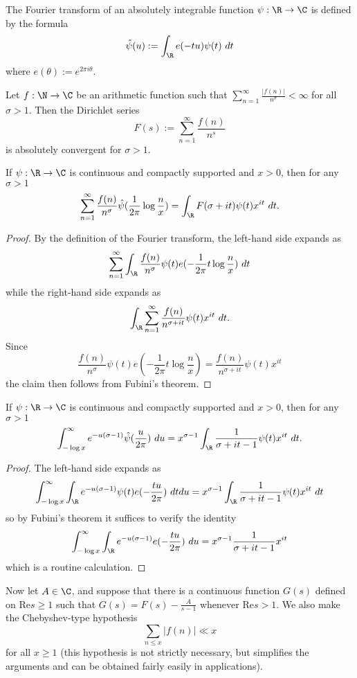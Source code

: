 
The Fourier transform of an absolutely integrable function $\psi: \R \to \C$ is defined by the formula
$$ \hat \psi(u) := \int_\R e(-tu) \psi(t)\ dt$$
where $e(\theta) := e^{2\pi i \theta}$.

Let $f: \N \to \C$ be an arithmetic function such that $\sum_{n=1}^\infty \frac{|f(n)|}{n^\sigma} < \infty$ for all $\sigma>1$.  Then the Dirichlet series
$$ F(s) := \sum_{n=1}^\infty \frac{f(n)}{n^s}$$
is absolutely convergent for $\sigma>1$.

\begin{lemma}\label{first-fourier}  If $\psi: \R \to \C$ is continuous and compactly supported and $x > 0$, then for any $\sigma>1$
  $$ \sum_{n=1}^\infty \frac{f(n)}{n^\sigma} \hat \psi( \frac{1}{2\pi} \log \frac{n}{x} ) = \int_\R F(\sigma + it) \psi(t) x^{it}\ dt.$$
\end{lemma}

\begin{proof}  By the definition of the Fourier transform, the left-hand side expands as
$$ \sum_{n=1}^\infty \int_\R \frac{f(n)}{n^\sigma} \psi(t) e( - \frac{1}{2\pi} t \log \frac{n}{x})\ dt$$
while the right-hand side expands as
$$ \int_\R \sum_{n=1}^\infty \frac{f(n)}{n^{\sigma+it}} \psi(t) x^{it}\ dt.$$
Since
$$\frac{f(n)}{n^\sigma} \psi(t) e( - \frac{1}{2\pi} t \log \frac{n}{x}) = \frac{f(n)}{n^{\sigma+it}} \psi(t) x^{it}$$
the claim then follows from Fubini's theorem.
\end{proof}

\begin{lemma}\label{second-fourier} If $\psi: \R \to \C$ is continuous and compactly supported and $x > 0$, then for any $\sigma>1$
$$ \int_{-\log x}^\infty e^{-u(\sigma-1)} \hat \psi(\frac{u}{2\pi})\ du = x^{\sigma - 1} \int_\R \frac{1}{\sigma+it-1} \psi(t) x^{it}\ dt.$$
\end{lemma}

\begin{proof}
  The left-hand side expands as
  $$ \int_{-\log x}^\infty \int_\R e^{-u(\sigma-1)} \psi(t) e(-\frac{tu}{2\pi})\ dt du = x^{\sigma - 1} \int_\R \frac{1}{\sigma+it-1} \psi(t) x^{it}\ dt$$
  so by Fubini's theorem it suffices to verify the identity
$$ \int_{-\log x}^\infty \int_\R e^{-u(\sigma-1)} e(-\frac{tu}{2\pi})\ du = x^{\sigma - 1} \frac{1}{\sigma+it-1} x^{it}$$
which is a routine calculation.
\end{proof}

Now let $A \in \C$, and suppose that there is a continuous function $G(s)$ defined on $\mathrm{Re} s \geq 1$ such that $G(s) = F(s) - \frac{A}{s-1}$ whenever $\mathrm{Re} s > 1$.  We also make the Chebyshev-type hypothesis
\begin{equation}\label{cheby}
\sum_{n \leq x} |f(n)| \ll x
\end{equation}
for all $x \geq 1$ (this hypothesis is not strictly necessary, but simplifies the arguments and can be obtained fairly easily in applications).

